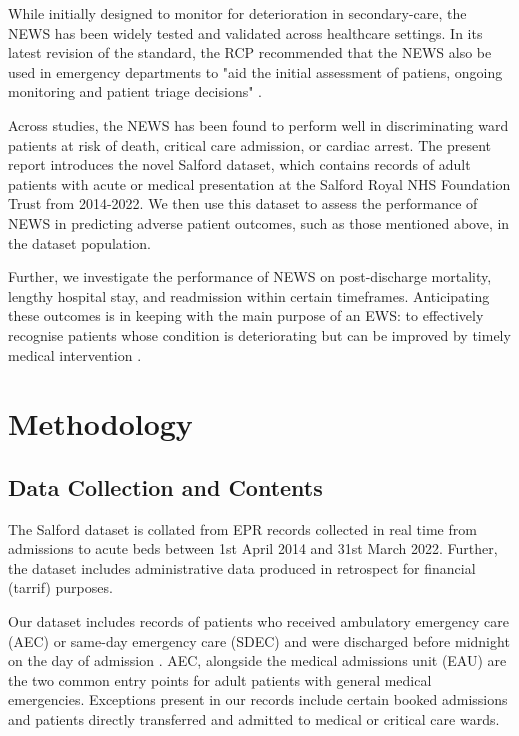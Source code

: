 \documentclass[10pt,journal, compsoc]{IEEEtran}
\begin{document}
While initially designed to monitor for deterioration in secondary-care, the NEWS has been widely tested and validated across healthcare settings. In its latest revision of the standard, the RCP recommended that the NEWS also be used in emergency departments to "aid the initial assessment of patiens, ongoing monitoring and patient triage decisions" \cite[pp.~18]{RCP17}.

Across studies, the NEWS has been found to perform well in discriminating ward patients at risk of death, critical care admission, or cardiac arrest. The present report introduces the novel Salford dataset, which contains records of adult patients with acute or medical presentation at the Salford Royal NHS Foundation Trust from 2014-2022. We then use this dataset to assess the performance of NEWS in predicting adverse patient outcomes, such as those mentioned above, in the dataset population.

Further, we investigate the performance of NEWS on post-discharge mortality, lengthy hospital stay, and readmission within certain timeframes. Anticipating these outcomes is in keeping with the main purpose of an EWS: to effectively recognise patients whose condition is deteriorating but can be improved by timely medical intervention  \cite[pp.~4]{Smith13}.

\section{Methodology}
\subsection{Data Collection and Contents}
The Salford dataset is collated from EPR records collected in real time from admissions to acute beds between 1st April 2014 and 31st March 2022. Further, the dataset includes administrative data produced in retrospect for financial (tarrif) purposes.

Our dataset includes records of patients who received ambulatory emergency care (AEC) or same-day emergency care (SDEC) and were discharged before midnight on the day of admission \cite{NHS18}. AEC, alongside the medical admissions unit (EAU)  are the two common entry points for adult patients with general medical emergencies. Exceptions present in our records include certain booked admissions and patients directly transferred and admitted to medical or critical care wards.
\end{document}
